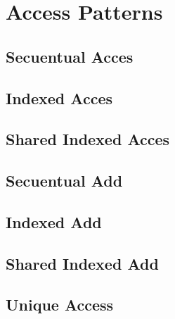 \section{Access Patterns}
\subsection{Secuentual Acces}
\subsection{Indexed Acces}
\subsection{Shared Indexed Acces}

\subsection{Secuentual Add}
\subsection{Indexed Add}
\subsection{Shared Indexed Add}

\subsection{Unique Access}
